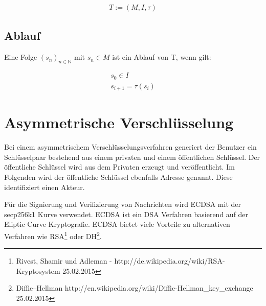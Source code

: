 \documentclass[a4paper,12pt]{report}
\begin{document}
\begin{eqnarray}
   T := (M,I,\tau)
\end{eqnarray}

\subsection*{Ablauf}
Eine Folge $(s_n)_{n\in\mathbb{N}}$ mit $s_n\in M$ ist ein Ablauf von T, wenn gilt:

\begin{eqnarray}
   s_0 \in I \\
   s_{i+1} = \tau(s_i) 
\end{eqnarray}


\section{Asymmetrische Verschlüsselung}
\label{crypt}


Bei einem asymmetrischem Verschlüsselungsverfahren generiert der Benutzer ein Schlüsselpaar bestehend aus einem privaten und einem öffentlichen Schlüssel. Der öffentliche Schlüssel wird aus dem Privaten erzeugt und veröffentlicht. Im Folgenden wird der öffentliche Schlüssel ebenfalls Adresse genannt. Diese identifiziert einen Akteur.

Für die Signierung und Verifizierung von Nachrichten wird ECDSA mit der secp256k1 Kurve verwendet. ECDSA ist ein DSA Verfahren basierend auf der Eliptic Curve Kryptografie. ECDSA bietet viele Vorteile zu alternativen Verfahren wie RSA\footnote{Rivest, Shamir und Adleman - http://de.wikipedia.org/wiki/RSA-Kryptosystem 25.02.2015} oder DH\footnote{Diffie–Hellman http://en.wikipedia.org/wiki/Diffie-Hellman\_key\_exchange 25.02.2015}. \cite{Pouillard2014a}
% 
% 
% 
% 
\end{document}
